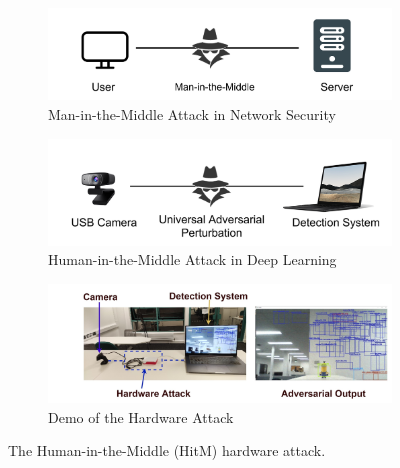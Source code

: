 
\begin{figure}[H]
    \centering
    \begin{subfigure}[b]{\textwidth}
        \includegraphics[width=\textwidth]{figures/chapter_detection/hardware/mitm.png}
        \caption{Man-in-the-Middle Attack in Network Security}
        \label{fig:mitm} 
    \end{subfigure}

    \begin{subfigure}[b]{\textwidth}
        \includegraphics[width=\textwidth]{figures/chapter_detection/hardware/overview.png}
        \caption{Human-in-the-Middle Attack in Deep Learning}
        \label{fig:minm}
    \end{subfigure}

    \begin{subfigure}[b]{\textwidth}
        \includegraphics[width=\textwidth]{figures/chapter_detection/hardware/demo.jpg}
        \caption{Demo of the Hardware Attack}
        \label{fig:demo}
    \end{subfigure}

  \caption{The Human-in-the-Middle (HitM)  hardware attack.}
  \label{fig:overview}
\end{figure}

